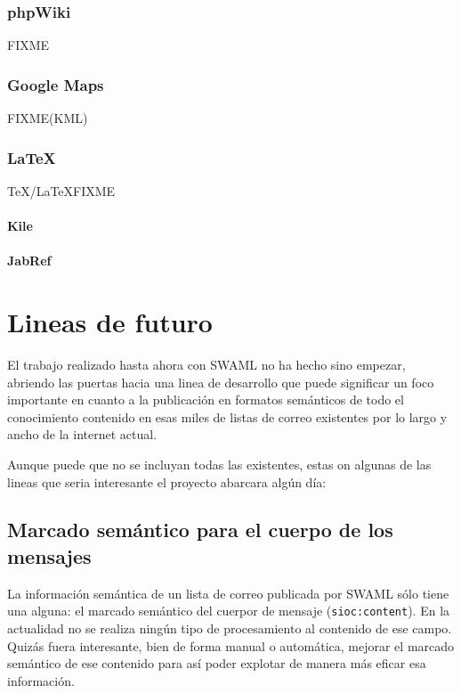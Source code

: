 \subsubsection{phpWiki}

FIXME

\subsubsection{Google Maps}

FIXME(KML)

\subsubsection{\LaTeX}

\TeX/\LaTeX FIXME

\paragraph{Kile}

\paragraph{JabRef}

\section{Lineas de futuro}

El trabajo realizado hasta ahora con SWAML no ha hecho sino empezar, abriendo las 
puertas hacia una linea de desarrollo que puede significar un foco importante
en cuanto a la publicación en formatos semánticos de todo el conocimiento contenido
en esas miles de listas de correo existentes por lo largo y ancho de la internet
actual.

Aunque puede que no se incluyan todas las existentes, estas on algunas de las lineas
que seria interesante el proyecto abarcara algún día:

\subsection*{Marcado semántico para el cuerpo de los mensajes}

La información semántica de un lista de correo publicada por SWAML sólo tiene una
alguna: el marcado semántico del cuerpor de mensaje (\texttt{sioc:content}). En
la actualidad no se realiza ningún tipo de procesamiento al contenido de ese campo.
Quizás fuera interesante, bien de forma manual o automática, mejorar el marcado
semántico de ese contenido para así poder explotar de manera más eficar esa 
información.

